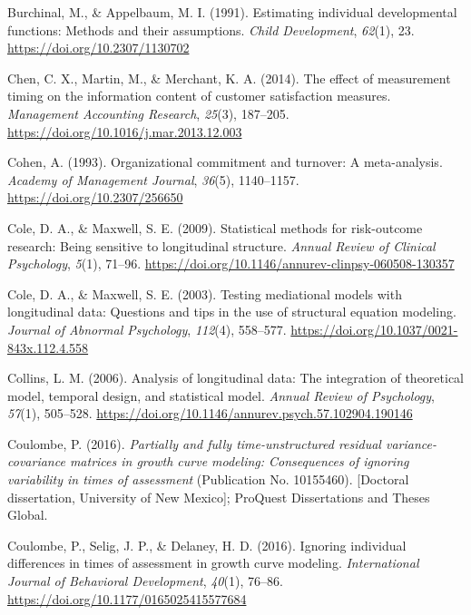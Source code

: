 \documentclass[
  english,
  man,floatsintext]{apa7}
\newlength{\cslhangindent}
\newlength{\cslentryspacingunit} %
\newenvironment{CSLReferences}[2] %
 {%
  \setlength{\parindent}{0pt}
  \ifodd #1
  \let\oldpar\par
  \def\par{\hangindent=\cslhangindent\oldpar}
  \fi
  \setlength{\parskip}{#2\cslentryspacingunit}
 }%
 {}
\begin{document}
\begin{CSLReferences}{1}{0}
\leavevmode{}%
Burchinal, M., \& Appelbaum, M. I. (1991). Estimating individual developmental functions: Methods and their assumptions. \emph{Child Development}, \emph{62}(1), 23. \url{https://doi.org/10.2307/1130702}

\leavevmode{}%
Chen, C. X., Martin, M., \& Merchant, K. A. (2014). The effect of measurement timing on the information content of customer satisfaction measures. \emph{Management Accounting Research}, \emph{25}(3), 187--205. \url{https://doi.org/10.1016/j.mar.2013.12.003}

\leavevmode{}%
Cohen, A. (1993). Organizational commitment and turnover: A meta-analysis. \emph{Academy of Management Journal}, \emph{36}(5), 1140--1157. \url{https://doi.org/10.2307/256650}

\leavevmode{}%
Cole, D. A., \& Maxwell, S. E. (2009). Statistical methods for risk-outcome research: Being sensitive to longitudinal structure. \emph{Annual Review of Clinical Psychology}, \emph{5}(1), 71--96. \url{https://doi.org/10.1146/annurev-clinpsy-060508-130357}

\leavevmode{}%
Cole, D. A., \& Maxwell, S. E. (2003). Testing mediational models with longitudinal data: Questions and tips in the use of structural equation modeling. \emph{Journal of Abnormal Psychology}, \emph{112}(4), 558--577. \url{https://doi.org/10.1037/0021-843x.112.4.558}

\leavevmode{}%
Collins, L. M. (2006). Analysis of longitudinal data: The integration of theoretical model, temporal design, and statistical model. \emph{Annual Review of Psychology}, \emph{57}(1), 505--528. \url{https://doi.org/10.1146/annurev.psych.57.102904.190146}

\leavevmode{}%
Coulombe, P. (2016). \emph{Partially and fully time-unstructured residual variance-covariance matrices in growth curve modeling: Consequences of ignoring variability in times of assessment} (Publication No. 10155460). {[}Doctoral dissertation, University of New Mexico{]}; {ProQuest Dissertations and Theses Global.}

\leavevmode{}%
Coulombe, P., Selig, J. P., \& Delaney, H. D. (2016). Ignoring individual differences in times of assessment in growth curve modeling. \emph{International Journal of Behavioral Development}, \emph{40}(1), 76--86. \url{https://doi.org/10.1177/0165025415577684}


\end{CSLReferences}
\end{document}
